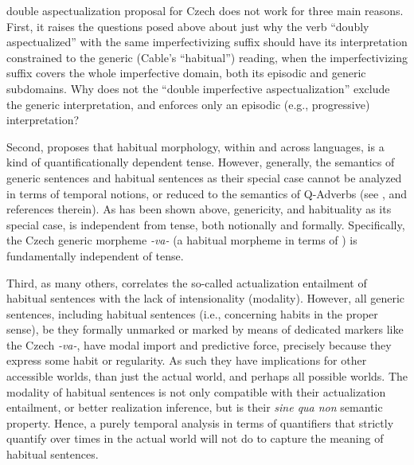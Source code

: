 \documentclass[output=paper,colorlinks,citecolor=brown]{langscibook}
\begin{document}
 double aspectualization proposal for Czech does not work for three main reasons. First, it raises the questions posed above about just why the verb ``doubly aspectualized'' with the same imperfectivizing suffix should
have its interpretation constrained to the generic (Cable's ``habitual'') reading, when the imperfectivizing suffix covers the whole imperfective domain, both its episodic and generic subdomains. Why does not the ``double imperfective aspectualization'' exclude the generic interpretation, and
enforces only an episodic (e.g., progressive) interpretation?

Second, \citet{cable2022} proposes that habitual
morphology, within and across languages, is a kind of quantificationally dependent tense. However, generally, the semantics of generic sentences and habitual sentences as their special case cannot be analyzed in terms of temporal notions, or reduced to the semantics of Q-Adverbs (see , and references therein).
As has been shown above, genericity, and habituality as its special case, is independent from tense, both notionally
and formally. Specifically, the Czech generic morpheme \textit{-va-} (a habitual morpheme in terms of \citealt{cable2022}) is
fundamentally independent of tense.

Third, as many others,
\citet{cable2022} correlates the so-called actualization entailment of habitual sentences with the lack of intensionality (modality). However, all generic sentences, including habitual sentences (i.e., concerning habits in the proper sense), be they formally unmarked or marked by means of dedicated markers like the Czech \textit{-va-}, have modal import and predictive force, precisely because
they express some habit or regularity. As such they have implications for other accessible worlds, than just the actual world, and perhaps all possible worlds. The modality of habitual sentences is not only compatible with their actualization entailment, or better realization inference, but is their \textit{sine qua non} semantic property.
Hence, a purely temporal analysis in terms of quantifiers
that strictly quantify over times in the actual world will not do to capture the meaning of habitual sentences.
\end{document}
